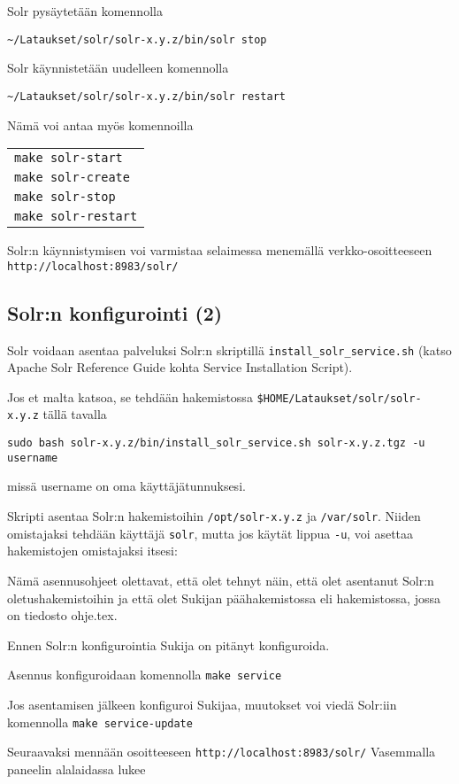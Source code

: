 \documentclass[12pt]{article}
\begin{document}
Solr pysäytetään komennolla

\verb|~/Lataukset/solr/solr-x.y.z/bin/solr stop|

Solr käynnistetään uudelleen komennolla

\verb|~/Lataukset/solr/solr-x.y.z/bin/solr restart|


Nämä voi antaa myös komennoilla

\begin{tabular}{@{}l}
\verb|make solr-start| \\
\verb|make solr-create| \\
\verb|make solr-stop| \\
\verb|make solr-restart|
\end{tabular}


Solr:n käynnistymisen voi varmistaa selaimessa menemällä
verkko-osoitteeseen
\verb|http://localhost:8983/solr/|


\subsection*{Solr:n konfigurointi (2)}

Solr voidaan asentaa palveluksi Solr:n skriptillä
\verb=install_solr_service.sh= 
(katso Apache Solr Reference Guide
kohta Service Installation Script).

Jos et malta katsoa, se tehdään hakemistossa
\verb=$HOME/Lataukset/solr/solr-x.y.z= tällä tavalla

{\footnotesize
\verb=sudo bash solr-x.y.z/bin/install_solr_service.sh solr-x.y.z.tgz -u username=
}

missä username on oma käyttäjätunnuksesi.


Skripti asentaa Solr:n hakemistoihin \verb=/opt/solr-x.y.z= ja
\verb=/var/solr=. Niiden omistajaksi tehdään käyttäjä \verb=solr=,
mutta jos käytät lippua \verb=-u=, voi asettaa hakemistojen
omistajaksi itsesi:


Nämä asennusohjeet olettavat, että olet tehnyt näin, että olet
asentanut Solr:n oletushakemistoihin ja että olet Sukijan
päähakemistossa eli hakemistossa, jossa on tiedosto ohje.tex.

Ennen Solr:n konfigurointia Sukija on pitänyt konfiguroida.

Asennus konfiguroidaan komennolla \verb=make service=

Jos asentamisen jälkeen konfiguroi Sukijaa,
muutokset voi viedä Solr:iin komennolla
\verb=make service-update=

Seuraavaksi mennään osoitteeseen \verb=http://localhost:8983/solr/=
Vasemmalla paneelin alalaidassa lukee 
\end{document}
